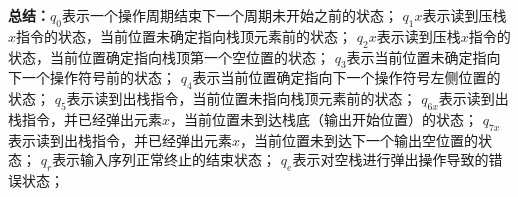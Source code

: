 \begin{solution}
    \textbf{总结：}$q_0$表示一个操作周期结束下一个周期未开始之前的状态；
    $q_1x$表示读到压栈$x$指令的状态，当前位置未确定指向栈顶元素前的状态；
    $q_2x$表示读到压栈$x$指令的状态，当前位置确定指向栈顶第一个空位置的状态；
    $q_3$表示当前位置未确定指向下一个操作符号前的状态；
    $q_4$表示当前位置确定指向下一个操作符号左侧位置的状态；
    $q_5$表示读到出栈指令，当前位置未指向栈顶元素前的状态；
    $q_{6x}$表示读到出栈指令，并已经弹出元素$x$，当前位置未到达栈底（输出开始位置）的状态；
    $q_{7x}$表示读到出栈指令，并已经弹出元素$x$，当前位置未到达下一个输出空位置的状态；
    $q_r$表示输入序列正常终止的结束状态；
    $q_e$表示对空栈进行弹出操作导致的错误状态；
\end{solution}